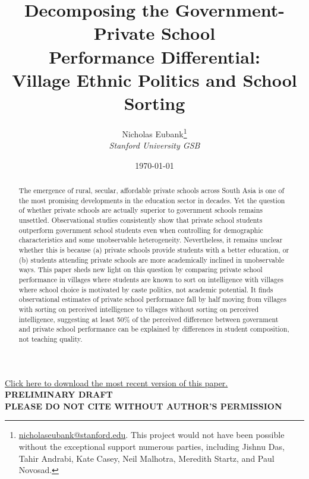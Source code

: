 \documentclass[11pt]{article}
\title{Decomposing the Government-Private School \\ Performance Differential: \\ Village Ethnic Politics and School Sorting}
\author{Nicholas Eubank\footnote{\href{mailto:nicholaseubank@stanford.edu}{nicholaseubank@stanford.edu}. This project would not have been possible without the exceptional support numerous parties, including Jishnu Das, Tahir Andrabi, Kate Casey, Neil Malhotra, Meredith Startz, and Paul Novosad.} \\ \emph{Stanford University GSB}}
\date{\today}
\begin{document}
\maketitle
\begin{center}
\vspace{1.5cm}

{\Large \color{blue}\href{http://www.nickeubank.com/eubank_schoolsorting/}{Click here to download the most recent version of this paper.}\color{black}}
\vspace{1.5cm}\\

\textbf{PRELIMINARY DRAFT \\ PLEASE DO NOT CITE WITHOUT AUTHOR'S PERMISSION} \\
\end{center}

\vspace{0.5cm}

\begin{abstract}
The emergence of rural, secular, affordable private schools across South Asia is one of the most promising developments in the education sector in decades. Yet the question of whether private schools are actually superior to government schools remains unsettled. Observational studies consistently show that private school students outperform government school students even when controlling for demographic characteristics and some unobservable heterogeneity. Nevertheless, it remains unclear whether this is because (a) private schools provide students with a better education, or (b) students attending private schools are more academically inclined in unobservable ways. This paper sheds new light on this question by comparing private school performance in villages where students are known to sort on intelligence with villages where school choice is motivated by caste politics, not academic potential. It finds observational estimates of private school performance fall by half moving from villages with sorting on perceived intelligence to villages without sorting on perceived intelligence, suggesting at least 50\% of the perceived difference between government and private school performance can be explained by differences in student composition, not teaching quality.
\end{abstract}

\thispagestyle{empty}



\pagebreak

\setcounter{page}{1}
\end{document}
